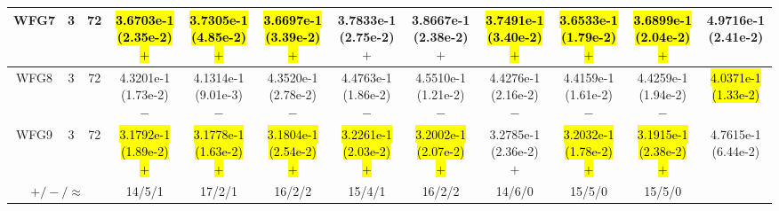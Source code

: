 \documentclass[journal]{IEEEtran}
\begin{document}
\begin{table*}[htbp]
\begin{tabular}{cccccccccccc}
\hline
\multirow{1}{*}{WFG7}&3&72&\hl{3.6703e-1 (2.35e-2) $+$}&\hl{3.7305e-1 (4.85e-2) $+$}&\hl{3.6697e-1 (3.39e-2) $+$}&3.7833e-1 (2.75e-2) $+$&3.8667e-1 (2.38e-2) $+$&\hl{3.7491e-1 (3.40e-2) $+$}&\hl{3.6533e-1 (1.79e-2) $+$}&\hl{3.6899e-1 (2.04e-2) $+$}&4.9716e-1 (2.41e-2)\\
\hline
\multirow{1}{*}{WFG8}&3&72&4.3201e-1 (1.73e-2) $-$&4.1314e-1 (9.01e-3) $-$&4.3520e-1 (2.78e-2) $-$&4.4763e-1 (1.86e-2) $-$&4.5510e-1 (1.21e-2) $-$&4.4276e-1 (2.16e-2) $-$&4.4159e-1 (1.61e-2) $-$&4.4259e-1 (1.94e-2) $-$&\hl{4.0371e-1 (1.33e-2)}\\
\hline
\multirow{1}{*}{WFG9}&3&72&\hl{3.1792e-1 (1.89e-2) $+$}&\hl{3.1778e-1 (1.63e-2) $+$}&\hl{3.1804e-1 (2.54e-2) $+$}&\hl{3.2261e-1 (2.03e-2) $+$}&\hl{3.2002e-1 (2.07e-2) $+$}&3.2785e-1 (2.36e-2) $+$&\hl{3.2032e-1 (1.78e-2) $+$}&\hl{3.1915e-1 (2.38e-2) $+$}&4.7615e-1 (6.44e-2)\\
\hline
\multicolumn{3}{c}{$+/-/\approx$}&14/5/1&17/2/1&16/2/2&15/4/1&16/2/2&14/6/0&15/5/0&15/5/0&\\
\bottomrule
\end{tabular}
\label{No Label}
\end{table*}
\end{document}
